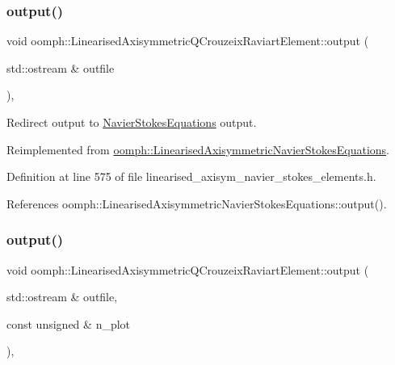 \subsubsection{\texorpdfstring{output()}{output()}\hspace{0.1cm}{\footnotesize\ttfamily [1/4]}}
{\footnotesize\ttfamily void oomph\+::\+Linearised\+Axisymmetric\+Q\+Crouzeix\+Raviart\+Element\+::output (\begin{DoxyParamCaption}\item[{std\+::ostream \&}]{outfile }\end{DoxyParamCaption})\hspace{0.3cm}{\ttfamily [inline]}, {\ttfamily [virtual]}}



Redirect output to \hyperlink{classoomph_1_1NavierStokesEquations}{Navier\+Stokes\+Equations} output. 



Reimplemented from \hyperlink{classoomph_1_1LinearisedAxisymmetricNavierStokesEquations_a70e8f2426b53160afabe2f6dce78b920}{oomph\+::\+Linearised\+Axisymmetric\+Navier\+Stokes\+Equations}.



Definition at line 575 of file linearised\+\_\+axisym\+\_\+navier\+\_\+stokes\+\_\+elements.\+h.



References oomph\+::\+Linearised\+Axisymmetric\+Navier\+Stokes\+Equations\+::output().

\mbox{\label{classoomph_1_1LinearisedAxisymmetricQCrouzeixRaviartElement_a332ee735b33a99dae78a799f369b3069}} 
\subsubsection{\texorpdfstring{output()}{output()}\hspace{0.1cm}{\footnotesize\ttfamily [2/4]}}
{\footnotesize\ttfamily void oomph\+::\+Linearised\+Axisymmetric\+Q\+Crouzeix\+Raviart\+Element\+::output (\begin{DoxyParamCaption}\item[{std\+::ostream \&}]{outfile,  }\item[{const unsigned \&}]{n\+\_\+plot }\end{DoxyParamCaption})\hspace{0.3cm}{\ttfamily [inline]}, {\ttfamily [virtual]}}



